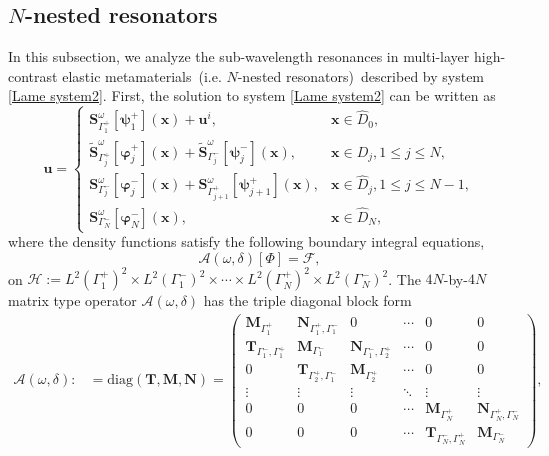 \documentclass[10pt,reqno,oneside]{amsart}%
\theoremstyle{definition}
\theoremstyle{remark}
\numberwithin{equation}{section}
\numberwithin{equation}{section}
\begin{document}
\subsection{$N$-nested resonators}In this subsection, we analyze the sub-wavelength resonances in multi-layer high-contrast elastic metamaterials~(i.e. $N$-nested resonators)~described by system \eqref{Lame system2}. First, the solution to system \eqref{Lame system2} can be written as
\begin{equation}\label{system solution2}
\mathbf{u}=
\begin{cases}
\mathbf{S}_{\Gamma_{1}^{+}}^{\omega}[\boldsymbol{\psi}_1^+](\mathbf{x})+\mathbf{u}^{i}, & \mathbf{x} \in \hat{D}_{0},\\
\tilde{\mathbf{S}}_{\Gamma_{j}^{+}}^{\omega}[\boldsymbol{\varphi}_j^+](\mathbf{x})+\tilde{\mathbf{S}}_{\Gamma_{j}^{-}}^{\omega}[\boldsymbol{\psi}_j^-](\mathbf{x}), & \mathbf{x} \in {D}_{j},1\leq j\leq N,\\
\mathbf{S}_{\Gamma_{j}^{-}}^{\omega}[\boldsymbol{\varphi}_j^-](\mathbf{x})+\mathbf{S}_{\Gamma_{j+1}^{+}}^{\omega}[\boldsymbol{\psi}_{j+1}^{+}](\mathbf{x}),& \mathbf{x} \in \hat{D}_{j},1\leq j\leq N-1,\\
\mathbf{S}_{\Gamma_{N}^{-}}^{\omega}[\boldsymbol{\varphi}_N^-](\mathbf{x}), & \mathbf{x} \in \hat{D}_{N},
\end{cases}
\end{equation}
where the density functions satisfy the following boundary integral equations,
\begin{equation}
\mathcal{A}(\omega, \delta)[\Phi]=\mathcal{F},\nonumber
\end{equation}
on $\mathcal{H}:=L^2(\Gamma_1^{+})^2\times L^2(\Gamma_1^{-})^2\times\cdots\times L^2(\Gamma_N^{+})^2\times L^2(\Gamma_N^{-})^2$. The $4N$-by-$4N$ matrix type operator $\mathcal{A}(\omega,\delta)$ has the triple diagonal block form
\begin{equation}\label{block diagonal2}%
\begin{aligned}
\mathcal{A}(\omega,\delta):&=\text{diag}\left(\mathbf{T},\mathbf{M},\mathbf{N}\right)=
\begin{pmatrix}
\mathbf{M}_{{\Gamma_1^{+}}} &\mathbf{N}_{\Gamma_1^{+},\Gamma_1^{-}} & 0& \cdots & 0&0\\%
 \mathbf{T}_{\Gamma_1^{-},\Gamma_1^{+}}& \mathbf{M}_{{\Gamma_1^{-}}}&  \mathbf{N}_{\Gamma_1^{-},\Gamma_2^{+}}&  \cdots & 0 & 0\\%
 0& \mathbf{T}_{{\Gamma_2^{+}},{\Gamma_1^{-}}}&\mathbf{M}_{{\Gamma_2^{+}}}&
 \cdots&0&0\\
\vdots & \vdots & \vdots & \ddots & \vdots & \vdots \\%
 0&0&0& \cdots &\mathbf{M}_{{\Gamma_N^{+}}} & \mathbf{N}_{{\Gamma_N^{+}},{\Gamma_N^{-}}} \\
  0&0&0& \cdots &\mathbf{T}_{{\Gamma_N^{-}},{\Gamma_N^{+}}}& \mathbf{M}_{{\Gamma_N^{-}}}
\end{pmatrix},%
\end{aligned}
\end{equation}
\end{document}
